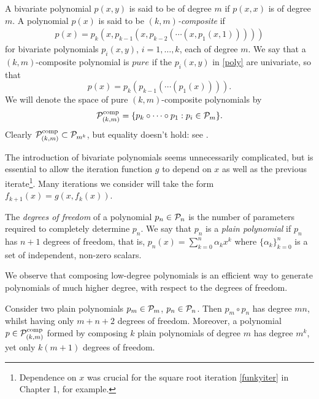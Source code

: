 \begin{defn}\label{comppolydefn}
A bivariate polynomial $p(x,y)$ is said to be of degree $m$ if $p(x,x)$ is of degree $m$. A polynomial $p(x)$ is said to be \textit{$(k,m)$-composite} if
\begin{align}
    p(x) = p_k(x,p_{k-1}(x,p_{k-2}(\cdots(x,p_1(x,1))))) \label{poly}
\end{align}
for bivariate polynomials $p_i(x,y)$, $i=1,\dots,k$, each of degree $m$. We say that a $(k,m)$-composite polynomial is $pure$ if the $p_i(x,y)$ in \eqref{poly} are univariate, so that
\[p(x) = p_k(p_{k-1}(\cdots(p_1(x)))).\]
We will denote the space of pure $(k,m)$-composite polynomials by 
\[\mathcal{P}_{(k,m)}^{\text{comp}}=\{p_k \circ \cdots \circ p_1 : p_i \in \mathcal{P}_m\}.\]
Clearly $\mathcal{P}_{(k,m)}^{\text{comp}} \subset \mathcal{P}_{m^k}$, but equality doesn't hold: see \cite{rickards}. 
\end{defn}

The introduction of bivariate polynomials seems unnecessarily complicated, but is essential to allow the iteration function $g$ to depend on $x$ as well as the previous iterate\footnote{Dependence on $x$ was crucial for the square root iteration \eqref{funkyiter} in Chapter 1, for example.}. Many iterations we consider will take the form $f_{k+1}(x)=g(x,f_k(x))$.

\begin{defn}
The \textit{degrees of freedom} of a polynomial $p_n \in \mathcal{P}_n$ is the number of parameters required to completely determine $p_n$. We say that $p_n$ is a \textit{plain polynomial} if $p_n$ has $n+1$ degrees of freedom, that is, $p_n(x) = \sum_{k=0}^n \alpha_k x^k$ where $\{\alpha_k\}_{k=0}^n$ is a set of independent, non-zero scalars.
\end{defn}

We observe that composing low-degree polynomials is an efficient way to generate polynomials of much higher degree, with respect to the degrees of freedom.

\begin{ex}
Consider two plain polynomials $p_m\in \mathcal{P}_m$, $p_n \in \mathcal{P}_n$. Then $p_m\circ p_n$ has degree $mn$, whilst having only $m+n+2$ degrees of freedom. Moreover, a polynomial $p \in \mathcal{P}_{(k,m)}^{\text{comp}}$ formed by composing $k$ plain polynomials of degree $m$ has degree $m^k$, yet only $k(m+1)$ degrees of freedom.
\end{ex}


